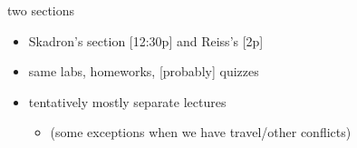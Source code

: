 \begin{frame}{two sections}
    \begin{itemize}
    \item Skadron's section [12:30p] and Reiss's [2p]
    \item same labs, homeworks, [probably] quizzes
    \vspace{.5cm}
    \item tentatively mostly separate lectures
        \begin{itemize}
        \item (some exceptions when we have travel/other conflicts)
        \end{itemize}
    \end{itemize}
\end{frame}
